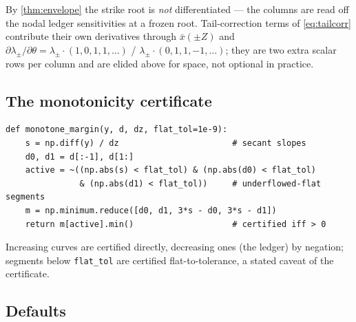 By \cref{thm:envelope} the strike root is \emph{not} differentiated ---
the columns are read off the nodal ledger sensitivities at a frozen
root.  Tail-correction terms of \eqref{eq:tailcorr} contribute their own
derivatives through $\bar{x}(\pm Z)$ and
$\partial\lambda_\pm/\partial\theta=\lambda_\pm\cdot(1,0,1,1,\dots)$ /
$\lambda_\pm\cdot(0,1,1,-1,\dots)$; they are two extra scalar rows per
column and are elided above for space, not optional in practice.

\subsection{The monotonicity certificate}

\begin{lstlisting}[caption={Fritsch--Carlson margin for a Hermite
interpolant with nodal derivatives \texttt{d} and values \texttt{y}.}]
def monotone_margin(y, d, dz, flat_tol=1e-9):
    s = np.diff(y) / dz                       # secant slopes
    d0, d1 = d[:-1], d[1:]
    active = ~((np.abs(s) < flat_tol) & (np.abs(d0) < flat_tol)
               & (np.abs(d1) < flat_tol))     # underflowed-flat segments
    m = np.minimum.reduce([d0, d1, 3*s - d0, 3*s - d1])
    return m[active].min()                    # certified iff > 0
\end{lstlisting}

Increasing curves are certified directly, decreasing ones (the ledger)
by negation; segments below \texttt{flat\_tol} are certified
flat-to-tolerance, a stated caveat of the certificate.

\subsection{Defaults}

